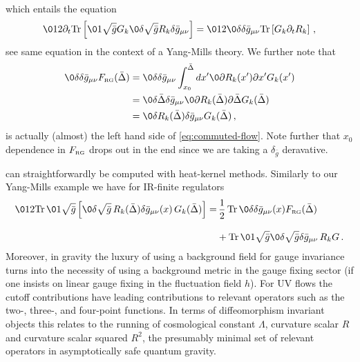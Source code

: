 \documentclass[11pt]{book} %
\newcommand{\Tr}{\mathrm{Tr}}
\begin{document}
{\begin{align}
\end{align}
which entails the equation
\begin{align} \label{eq:commuted-flow}
 \012 \partial_t \Tr \left[ \01{\sqrt{\bar g}} G_k \0{\delta  \sqrt{\bar g} R_k}{ \delta \bar g_{\mu\nu}}  \right]
 = \012 \0{\delta}{\delta \bar g_{\mu\nu}} \Tr \left[ G_k \partial_t R_k \right] \,,
\end{align}
see \cite{Litim:2002ce} same equation in the context of a Yang-Mills theory.
We further note that
\begin{align}
 \0{\delta}{\delta \bar g_{\mu\nu}} F_{\text{\tiny RG}}(\bar \Delta)
 &= \0{\delta}{\delta \bar g_{\mu\nu}} \int_{x_0}^{\bar\Delta} d x' \0{\partial R_k(x')}{\partial x'} G_k(x') \notag \\
 &= \0{\delta \bar \Delta}{ \delta \bar g_{\mu\nu}} \0{\partial R_k(\bar \Delta)}{\partial \bar \Delta} G_k(\bar \Delta) \notag \\
 &= \0{\delta R_k(\bar \Delta)}{ \delta \bar g_{\mu\nu}} G_k(\bar \Delta)\,,
\end{align}
is actually (almost) the left hand side of \eqref{eq:commuted-flow}.
Note further that $x_0$ dependence in $F_{\text{\tiny RG}}$ drops out in the end since we are taking a $\delta_{\bar g}$ deravative.


 can straightforwardly be computed with heat-kernel methods.
Similarly to our Yang-Mills example we have for IR-finite regulators
\begin{align}\nonumber
  \012 \Tr\, \0{1}{\sqrt{\bar g}}\left[\0{\delta \sqrt{\bar g} \, R_k(\bar \Delta)}{\delta \bar g_{\mu\nu}(x)}\,
  G_k(\bar \Delta )\right] =&  \, \frac{1}{2} \, \Tr\, \0{\delta }{\delta \bar g_{\mu\nu}(x)} F_{\text{\tiny{RG}}}(\bar\Delta)\\[2ex]
                            & +
                              \Tr \, \0{1}{\sqrt{\bar g}}\0{\delta \sqrt{\bar g}}{\delta \bar g_{\mu\nu}}\, R_k G \,.
\label{eq:g-Rkg}
\end{align}
Moreover, in gravity the luxury of using a background field for gauge
invariance turns into the necessity of using a background metric in
the gauge fixing sector (if one insists on linear gauge fixing in the
fluctuation field $h$). For UV flows the cutoff contributions have
leading contributions to relevant operators such as the two-, three-,
and four-point functions. In terms of diffeomorphism invariant objects
this relates to the running of cosmological constant $\Lambda$,
curvature scalar $R$ and curvature scalar squared $R^2$, the presumably
minimal set of relevant operators in asymptotically safe quantum
gravity.

}
\end{document}
